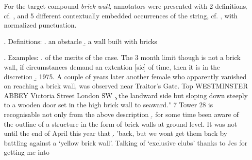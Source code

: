 
For the target compound \emph{brick wall},
annotators were presented with 2 definitions, cf. \Next, and 5
different contextually embedded occurrences of the string, cf. \NNext, with normalized punctuation.

\ex. Definitions:
\a. an obstacle
\b. a wall built with bricks

\enlargethispage{2\baselineskip}
\ex. Examples:
\a.  of the merits of the case. The 3 month limit though is not a brick wall, if circumstances demand an extention [sic] of time, then it is in the discretion%
\b. 1975. A couple of years later another female who apparently vanished on reaching a brick wall, was observed near Traitor's Gate. Top WESTMINSTER ABBEY Victoria Street London SW
\c. the landward side but sloping down steeply to a wooden door set in the high brick wall to seaward." 7 Tower 28 is recognisable not only from the above description
\d. for some time been aware of the outline of a structure in the form of brick walls at ground level. It was not until the end of April this year that
\d. 'back, but we wont get them back by battling against a `yellow brick wall'. Talking of `exclusive clubs' thanks to Jes for getting me into
   
